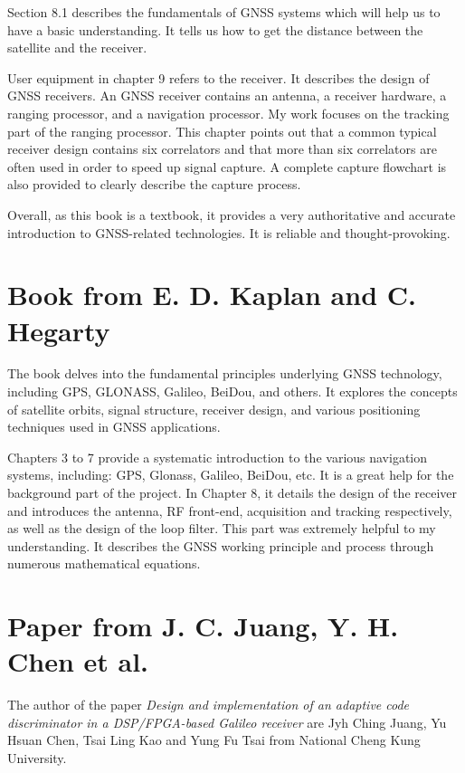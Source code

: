 Section 8.1 describes the fundamentals of GNSS systems which will help us to have a basic understanding. It tells us how to get the distance between the satellite and the receiver.

User equipment in chapter 9 refers to the receiver. It describes the design of GNSS receivers. An GNSS receiver contains an antenna, a receiver hardware, a ranging processor, and a navigation processor. My work focuses on the tracking part of the ranging processor. This chapter points out that a common typical receiver design contains six correlators and that more than six correlators are often used in order to speed up signal capture. A complete capture flowchart is also provided to clearly describe the capture process.

Overall, as this book is a textbook, it provides a very authoritative and accurate introduction to GNSS-related technologies. It is reliable and thought-provoking.

\section{Book from E. D. Kaplan and C. Hegarty\texorpdfstring{\cite{RN177}}{}}
The book delves into the fundamental principles underlying GNSS technology, including GPS, GLONASS, Galileo, BeiDou, and others. It explores the concepts of satellite orbits, signal structure, receiver design, and various positioning techniques used in GNSS applications.

Chapters 3 to 7 provide a systematic introduction to the various navigation systems, including: GPS, Glonass, Galileo, BeiDou, etc. It is a great help for the background part of the project. In Chapter 8, it details the design of the receiver and introduces the antenna, RF front-end, acquisition and tracking respectively, as well as the design of the loop filter. This part was extremely helpful to my understanding. It describes the GNSS working principle and process through numerous mathematical equations.

\section{Paper from J. C. Juang, Y. H. Chen et al.\texorpdfstring{\cite{RN147}}{}}
The author of the paper \textit{Design and implementation of an adaptive code discriminator in a DSP/FPGA-based Galileo receiver} are Jyh Ching Juang, Yu Hsuan Chen, Tsai Ling Kao and Yung Fu Tsai from National Cheng Kung University. 

